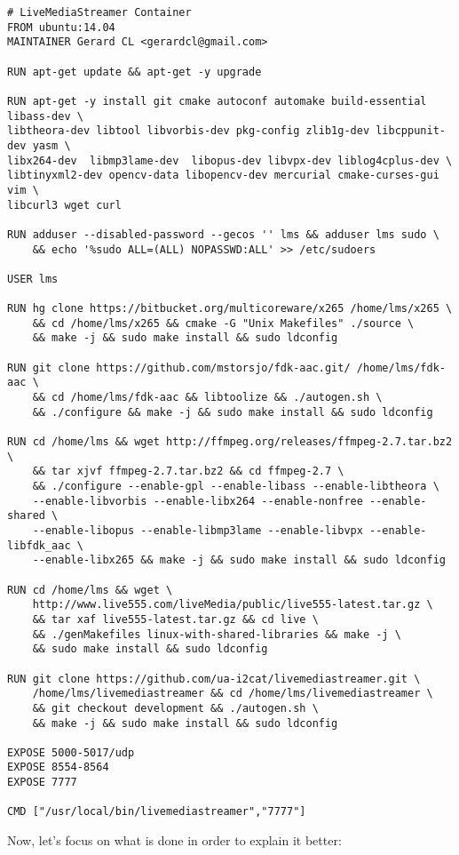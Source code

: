 \begin{verbatim}
# LiveMediaStreamer Container
FROM ubuntu:14.04
MAINTAINER Gerard CL <gerardcl@gmail.com>

RUN apt-get update && apt-get -y upgrade

RUN apt-get -y install git cmake autoconf automake build-essential libass-dev \
libtheora-dev libtool libvorbis-dev pkg-config zlib1g-dev libcppunit-dev yasm \ 
libx264-dev  libmp3lame-dev  libopus-dev libvpx-dev liblog4cplus-dev \ 
libtinyxml2-dev opencv-data libopencv-dev mercurial cmake-curses-gui vim \
libcurl3 wget curl 

RUN adduser --disabled-password --gecos '' lms && adduser lms sudo \
	&& echo '%sudo ALL=(ALL) NOPASSWD:ALL' >> /etc/sudoers

USER lms

RUN hg clone https://bitbucket.org/multicoreware/x265 /home/lms/x265 \
	&& cd /home/lms/x265 && cmake -G "Unix Makefiles" ./source \
	&& make -j && sudo make install && sudo ldconfig

RUN git clone https://github.com/mstorsjo/fdk-aac.git/ /home/lms/fdk-aac \
	&& cd /home/lms/fdk-aac && libtoolize && ./autogen.sh \
	&& ./configure && make -j && sudo make install && sudo ldconfig

RUN cd /home/lms && wget http://ffmpeg.org/releases/ffmpeg-2.7.tar.bz2 \
	&& tar xjvf ffmpeg-2.7.tar.bz2 && cd ffmpeg-2.7 \
	&& ./configure --enable-gpl --enable-libass --enable-libtheora \
	--enable-libvorbis --enable-libx264 --enable-nonfree --enable-shared \
	--enable-libopus --enable-libmp3lame --enable-libvpx --enable-libfdk_aac \
	--enable-libx265 && make -j && sudo make install && sudo ldconfig

RUN cd /home/lms && wget \
	http://www.live555.com/liveMedia/public/live555-latest.tar.gz \
	&& tar xaf live555-latest.tar.gz && cd live \
	&& ./genMakefiles linux-with-shared-libraries && make -j \
	&& sudo make install && sudo ldconfig

RUN git clone https://github.com/ua-i2cat/livemediastreamer.git \
	/home/lms/livemediastreamer && cd /home/lms/livemediastreamer \
	&& git checkout development && ./autogen.sh \
	&& make -j && sudo make install && sudo ldconfig

EXPOSE 5000-5017/udp
EXPOSE 8554-8564
EXPOSE 7777

CMD ["/usr/local/bin/livemediastreamer","7777"] 
\end{verbatim}

Now, let's focus on what is done in order to explain it better: 

